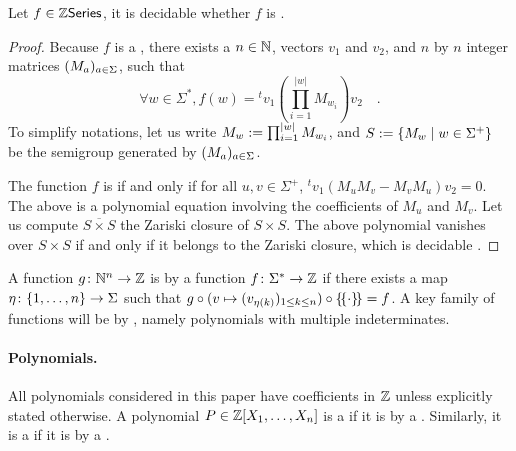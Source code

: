 \begin{lemma}
    \label{decidable-commutative-rat:lemma}
    Let $f \in \mathbb{Z}\mathsf{Series}$, it is decidable whether
    $f$ is .
\end{lemma}
\begin{proof}
    Because $f$ is a ,
    there exists a $n \in \mathbb{N}$,
    vectors $v_1$ and $v_2$,
    and $n$ by $n$ integer matrices $(M_a)_{a \in \Sigma}$,
    such that
    \begin{equation*}
        \forall w \in \Sigma^*,
        f(w) = {}^t v_1 \left(\prod_{i = 1}^{|w|} M_{w_i}\right) v_2 \quad .
    \end{equation*}
    To simplify notations, 
    let us write $M_w \mathrel{:=} \prod_{i = 1}^{|w|} M_{w_i}$,
    and 
    $S \mathrel{:=} \mathopen{\{} M_w \mid w \in \Sigma^+ \mathclose{\}}$ be the
    semigroup generated by $(M_a)_{a \in \Sigma}$.

    The function $f$ is  if and only if for all $u,v \in
    \Sigma^+$, ${}^t v_1 (M_u M_v  - M_v M_u) v_2 = 0$. The above is a
    polynomial equation involving the coefficients of $M_u$ and $M_v$.
    Let us compute $\overline{S \times S}$ the Zariski closure of $S \times S$.
    The above polynomial vanishes over $S \times S$ if and only
    if it belongs to the Zariski closure, which is decidable
    \cite{HROUPOWO18}.
\end{proof}

\AP A function $g \colon \mathbb{N}^n \to \mathbb{Z}$ is  by a function
$f \colon \Sigma^* \to \mathbb{Z}$ if there exists a map $\eta \colon \mathopen{\{} 1, \dots,
n \mathclose{\}} \to \Sigma$ such that $g \circ (v \mapsto \seqof{v_{\eta(k)}}{1 \leq k \leq
n}) \circ \commute = f$. A key family of functions will be  by
, namely polynomials with multiple indeterminates.

\AP \paragraph*{Polynomials.} All polynomials considered in this paper have
coefficients in $\mathbb{Z}$ unless explicitly stated otherwise. A polynomial $P \in
\mathbb{Z}[X_1, \dots, X_n]$ is a  if it
is  by a . Similarly, it is a
 if it is  by a
. 


